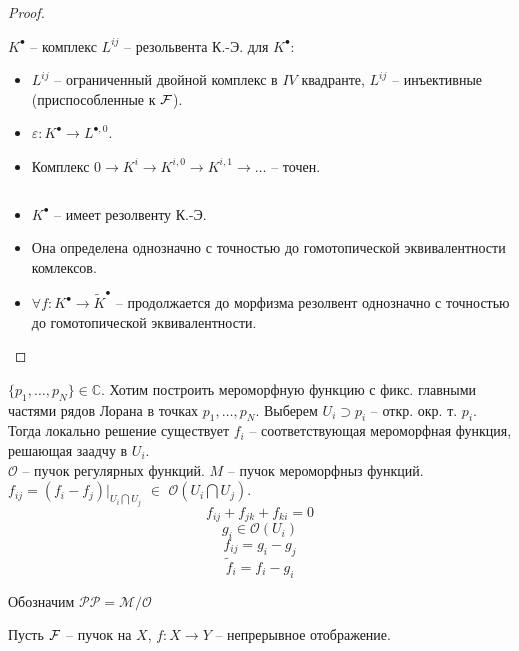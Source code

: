 \documentclass[../main.tex]{subfiles}
\begin{document}
\begin{proof}
\begin{to_def}
$K^\bullet$ -- комплекс $L^{ij}$ -- резольвента К.-Э. для $K^\bullet$:
\begin{itemize}
    \item $L^{ij}$ -- ограниченный двойной комплекс в $IV$ квадранте, $L^{ij}$ -- инъективные (приспособленные к $\mathcal{F}$).
    \item $\varepsilon\colon K^\bullet \to L^{\bullet, 0}$.
    \item Комплекс $0 \to K^i \to K^{i, 0} \to K^{i, 1}\to \ldots$ -- точен.
\end{itemize}
\end{to_def}
\begin{to_thr}
$ $\\
\begin{itemize}
    \item $K^\bullet$ -- имеет резолвенту К.-Э.
    \item Она определена однозначно с точностью до гомотопической эквивалентности комлексов.
    \item $\forall f\colon K^\bullet \to \tilde{K}^\bullet$ -- продолжается до морфизма резолвент однозначно с точностью до гомотопической эквивалентности. 
\end{itemize}
\end{to_thr}
\end{proof}
\begin{to_suj}
$\lbrace p_1, \ldots, p_N\rbrace \in \mathbb{C}$. Хотим построить мероморфную функцию с фикс. главными частями рядов Лорана в точках $p_1, \ldots, p_N$. Выберем $U_i \supset p_i$ -- откр. окр. т. $p_i$. Тогда локально решение существует $f_i$ -- соответствующая мероморфная функция, решающая заадчу в $U_i$.\\
$\mathcal{O}$ -- пучок регулярных функций. $M$ -- пучок мероморфныз функций. $f_{ij} = (f_i - f_j)\vert_{U_i\bigcap U_j}$ $\in$ $\mathcal{O}(U_i\bigcap U_j)$.
\[ f_{ij} + f_{jk} + f_{ki} = 0\]
\[
g_i \in \mathcal{O}(U_i)
\]
\[f_{ij} = g_i - g_j\]
\[\tilde{f}_i = f_i - g_i\]
\end{to_suj}
Обозначим $\mathcal{PP} = \mathcal{M}/\mathcal{O}$
\bee
{}
\eee
Пусть $\mathcal{F}$ -- пучок на $X$, $f\colon X \to Y$ -- непрерывное отображение. 
\end{document}
